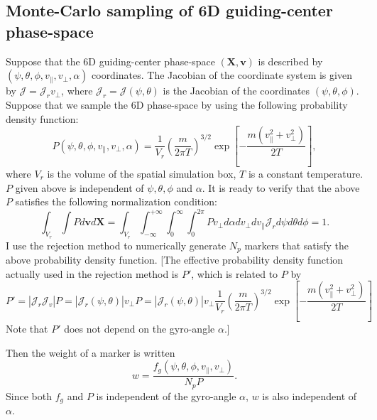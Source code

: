 \documentclass{llncs}
\begin{document}
\subsection{Monte-Carlo sampling of 6D guiding-center phase-space
}\label{19-1-28-1}

Suppose that the 6D guiding-center phase-space $(\mathbf{X}, \mathbf{v})$ is
described by $(\psi, \theta, \phi, v_{\parallel}, v_{\perp}, \alpha)$
coordinates. The Jacobian of the coordinate system is given by $\mathcal{J} =
\mathcal{J}_r v_{\perp} \mathcal{}$, where $\mathcal{J}_r = \mathcal{J} (\psi,
\theta)$ is the Jacobian of the coordinates $(\psi, \theta, \phi)$. Suppose
that we sample the 6D phase-space by using the following probability density
function:
\begin{equation}
  \label{19-1-26-1} P (\psi, \theta, \phi, v_{\parallel}, v_{\perp}, \alpha) =
  \frac{1}{V_r} \left( \frac{m}{2 \pi T} \right)^{3 / 2} \exp \left[ - \frac{m
  (v_{\parallel}^2 + v_{\perp}^2)}{2 T} \right],
\end{equation}
where $V_r$ is the volume of the spatial simulation box, $T$ is a constant
temperature. $P$ given above is independent of $\psi, \theta, \phi$ and
$\alpha$. It is ready to verify that the above $P$ satisfies the following
normalization condition:
\begin{equation}
  \int_{V_r} \int P d\mathbf{v}d\mathbf{X}= \int_{V_r} \int_{- \infty}^{+
  \infty} \int_0^{\infty} \int_0^{2 \pi} P v_{\perp} d \alpha d v_{\perp} d
  v_{\parallel} \mathcal{J}_r d \psi d \theta d \phi = 1.
\end{equation}
I use the rejection method to numerically generate $N_p$ markers that satisfy
the above probability density function. [The effective probability density
function actually used in the rejection method is $P'$, which is related to
$P$ by
\begin{equation}
  P' = | \mathcal{J}_r \mathcal{J}_v | P = | \mathcal{J}_r (\psi, \theta) |
  v_{\perp} P = | \mathcal{J}_r (\psi, \theta) | v_{\perp} \frac{1}{V_r}
  \left( \frac{m}{2 \pi T} \right)^{3 / 2} \exp \left[ - \frac{m
  (v_{\parallel}^2 + v_{\perp}^2)}{2 T} \right]
\end{equation}
Note that $P'$ does not depend on the gyro-angle $\alpha$.]

Then the weight of a marker is written
\begin{equation}
  w = \frac{f_g (\psi, \theta, \phi, v_{\parallel}, v_{\perp})}{N_p P} .
\end{equation}
Since both $f_g$ and $P$ is independent of the gyro-angle $\alpha$, $w$ is
also independent of $\alpha$.
\end{document}
